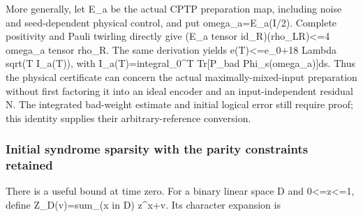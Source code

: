 \documentclass[
]{article}
\begin{document}
More generally, let E\_a be the actual CPTP preparation map, including
noise and seed-dependent physical control, and put
o\allowbreak{}m\allowbreak{}e\allowbreak{}g\allowbreak{}a\allowbreak{}\_\allowbreak{}a\allowbreak{}=\allowbreak{}E\allowbreak{}\_\allowbreak{}a\allowbreak{}(\allowbreak{}I\allowbreak{}/\allowbreak{}2\allowbreak{})\allowbreak{}.
Complete positivity and Pauli twirling directly give (E\_a tensor
i\allowbreak{}d\allowbreak{}\_\allowbreak{}R\allowbreak{})\allowbreak{}(\allowbreak{}r\allowbreak{}h\allowbreak{}o\allowbreak{}\_\allowbreak{}L\allowbreak{}R\allowbreak{})\allowbreak{}<\allowbreak{}=\allowbreak{}4
omega\_a tensor rho\_R. The same derivation yields e(T)\textless=e\_0+18
Lambda sqrt(T I\_a(T)), with
I\allowbreak{}\_\allowbreak{}a\allowbreak{}(\allowbreak{}T\allowbreak{})\allowbreak{}=\allowbreak{}i\allowbreak{}n\allowbreak{}t\allowbreak{}e\allowbreak{}g\allowbreak{}r\allowbreak{}a\allowbreak{}l\allowbreak{}\_\allowbreak{}0\allowbreak{}\^{}\allowbreak{}T
Tr{[}P\_bad
P\allowbreak{}h\allowbreak{}i\allowbreak{}\_\allowbreak{}s\allowbreak{}(\allowbreak{}o\allowbreak{}m\allowbreak{}e\allowbreak{}g\allowbreak{}a\allowbreak{}\_\allowbreak{}a\allowbreak{})\allowbreak{}]\allowbreak{}d\allowbreak{}s\allowbreak{}.
Thus the physical certificate can concern the actual
maximally-mixed-input preparation without first factoring it into an
ideal encoder and an input-independent residual N. The integrated
bad-weight estimate and initial logical error still require proof; this
identity supplies their arbitrary-reference conversion.

\subsubsection{Initial syndrome sparsity with the parity constraints
retained}\label{initial-syndrome-sparsity-with-the-parity-constraints-retained}

There is a useful bound at time zero. For a binary linear space D and
0\textless=z\textless=1, define Z\_D(v)=sum\_(x in D)
z\^{}\textbar x+v\textbar. Its character expansion is
\end{document}

